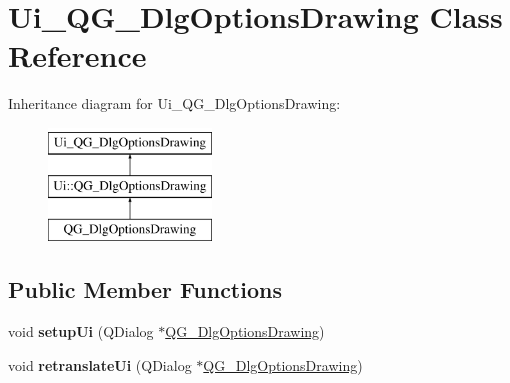\hypertarget{classUi__QG__DlgOptionsDrawing}{\section{Ui\-\_\-\-Q\-G\-\_\-\-Dlg\-Options\-Drawing Class Reference}
\label{classUi__QG__DlgOptionsDrawing}
}
Inheritance diagram for Ui\-\_\-\-Q\-G\-\_\-\-Dlg\-Options\-Drawing\-:\begin{figure}[H]
\begin{center}
\leavevmode
\includegraphics[height=3.000000cm]{classUi__QG__DlgOptionsDrawing}
\end{center}
\end{figure}
\subsection*{Public Member Functions}
\begin{DoxyCompactItemize}
\item 
\hypertarget{classUi__QG__DlgOptionsDrawing_a0e3d4dae057bc4f9966e73a28992701e}{void {\bfseries setup\-Ui} (Q\-Dialog $\ast$\hyperlink{classQG__DlgOptionsDrawing}{Q\-G\-\_\-\-Dlg\-Options\-Drawing})}\label{classUi__QG__DlgOptionsDrawing_a0e3d4dae057bc4f9966e73a28992701e}

\item 
\hypertarget{classUi__QG__DlgOptionsDrawing_aa709ccf8a8450529d8110d4a47c0a350}{void {\bfseries retranslate\-Ui} (Q\-Dialog $\ast$\hyperlink{classQG__DlgOptionsDrawing}{Q\-G\-\_\-\-Dlg\-Options\-Drawing})}\label{classUi__QG__DlgOptionsDrawing_aa709ccf8a8450529d8110d4a47c0a350}

\end{DoxyCompactItemize}
